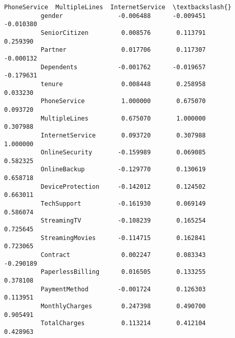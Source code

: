 \documentclass[11pt]{article}
\begin{document}
\begin{Verbatim}[commandchars=\\\{\}]
                            PhoneService  MultipleLines  InternetService  \textbackslash{}
          gender               -0.006488      -0.009451        -0.010380   
          SeniorCitizen         0.008576       0.113791         0.259390   
          Partner               0.017706       0.117307        -0.000132   
          Dependents           -0.001762      -0.019657        -0.179631   
          tenure                0.008448       0.258958         0.033230   
          PhoneService          1.000000       0.675070         0.093720   
          MultipleLines         0.675070       1.000000         0.307988   
          InternetService       0.093720       0.307988         1.000000   
          OnlineSecurity       -0.159989       0.069085         0.582325   
          OnlineBackup         -0.129770       0.130619         0.658718   
          DeviceProtection     -0.142012       0.124502         0.663011   
          TechSupport          -0.161930       0.069149         0.586074   
          StreamingTV          -0.108239       0.165254         0.725645   
          StreamingMovies      -0.114715       0.162841         0.723065   
          Contract              0.002247       0.083343        -0.290189   
          PaperlessBilling      0.016505       0.133255         0.378108   
          PaymentMethod        -0.001724       0.126303         0.113951   
          MonthlyCharges        0.247398       0.490700         0.905491   
          TotalCharges          0.113214       0.412104         0.428963   
          

\end{Verbatim}
\end{document}
